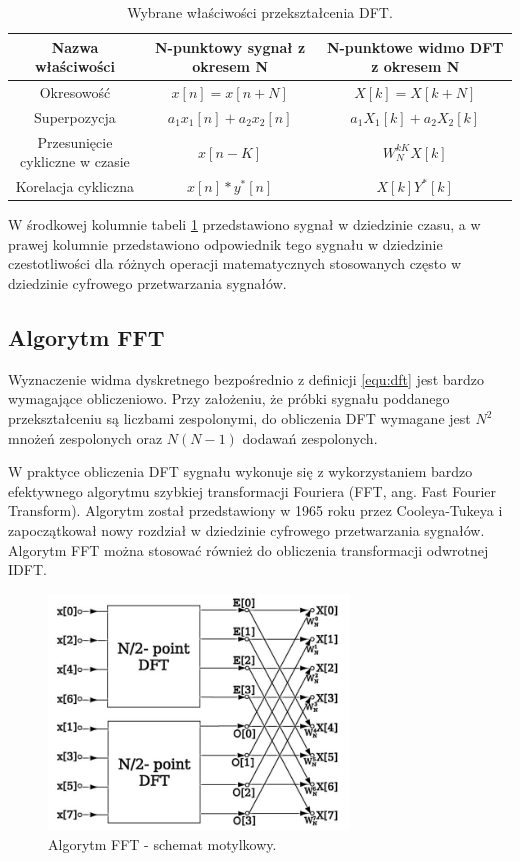 \begin{table}[H]
	\caption{Wybrane właściwości przekształcenia DFT.}
	\centering
	\label{tab:dft_wlasc}
	\begin{tabular}{|c|c|c|}
		\hline 
		\textbf{Nazwa właściwości} & \textbf{N-punktowy sygnał z okresem N} & \textbf{N-punktowe widmo DFT z okresem N} 	\\
		\hline
		Okresowość					& $x[n] = x[n + N]$ 				& $X[k] = X[k + N]$ 				\\	\hline
		Superpozycja			& $a_{1}x_{1}[n] + a_{2}x_{2}[n]$			& $a_{1}X_{1}[k] + a_{2}X_{2}[k]$			\\	\hline
		Przesunięcie cykliczne w czasie			& $x[n-K]$			& $ W_{N}^{kK}X[k]$			\\	\hline
		Korelacja cykliczna 		 				& $x[n]*y^{*}[n]$			& $X[k]Y^{*}[k]$			\\ 	\hline
	\end{tabular}
\end{table}
W środkowej kolumnie tabeli \ref{tab:dft_wlasc} przedstawiono sygnał w dziedzinie czasu, a w prawej kolumnie przedstawiono odpowiednik tego sygnału w dziedzinie czestotliwości dla różnych operacji matematycznych stosowanych często w dziedzinie cyfrowego przetwarzania sygnałów.

\subsection{Algorytm FFT}
Wyznaczenie widma dyskretnego bezpośrednio z definicji \ref{equ:dft} jest bardzo wymagające obliczeniowo. Przy założeniu, że próbki sygnału poddanego przekształceniu są liczbami zespolonymi, do obliczenia DFT wymagane jest $N^{2}$ mnożeń zespolonych oraz $N(N-1)$ dodawań zespolonych.

W praktyce obliczenia DFT sygnału wykonuje się z wykorzystaniem bardzo efektywnego algorytmu szybkiej transformacji Fouriera (FFT, ang. Fast Fourier Transform). Algorytm został przedstawiony w 1965 roku przez Cooleya-Tukeya i zapoczątkował nowy rozdział w dziedzinie cyfrowego przetwarzania sygnałów. Algorytm FFT można stosować również do obliczenia transformacji odwrotnej IDFT.

\begin{figure}[H]
	\centering
	\includegraphics[width=8cm]{./grafiki/fft_motylki}
	\captionsetup{justification=centering}
	\caption{Algorytm FFT - schemat motylkowy.}
	\label{rys:fft_motyl}
\end{figure}

